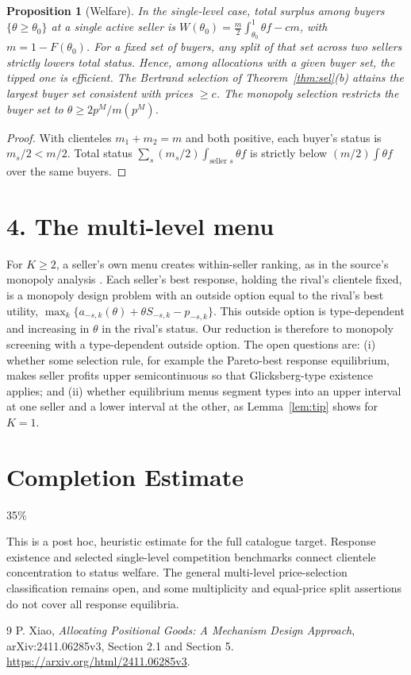 \documentclass[11pt]{article}
\newtheorem{proposition}[theorem]{Proposition}
\theoremstyle{definition}
\begin{document}
\begin{proposition}[Welfare]\label{prop:welfare}
In the single-level case, total surplus among buyers $\{\theta\ge\theta_0\}$ at a single active seller is
$W(\theta_0)=\tfrac{m}{2}\int_{\theta_0}^1\theta f-cm$, with $m=1-F(\theta_0)$. For a fixed set of buyers, any split of that
set across two sellers strictly lowers total status. Hence, among allocations with a given buyer set, the tipped one is
efficient. The Bertrand selection of Theorem~\ref{thm:sel}(b) attains the largest buyer set consistent with prices
$\ge c$. The monopoly selection restricts the buyer set to $\theta\ge2p^M/m(p^M)$.
\end{proposition}
\begin{proof}
With clienteles $m_1+m_2=m$ and both positive, each buyer's status is $m_s/2<m/2$. Total status
$\sum_s(m_s/2)\int_{\text{seller }s}\theta f$ is strictly below $(m/2)\int\theta f$ over the same buyers.
\end{proof}

\section*{4. The multi-level menu}
For $K\ge2$, a seller's own menu creates within-seller ranking, as in the source's monopoly analysis \cite{xiao}. Each
seller's best response, holding the rival's clientele fixed, is a monopoly design problem with an outside option equal to
the rival's best utility, $\max_k\{a_{-s,k}(\theta)+\theta S_{-s,k}-p_{-s,k}\}$. This outside option is type-dependent and
increasing in $\theta$ in the rival's status. Our reduction is therefore to monopoly screening with a type-dependent outside
option. The open questions are: (i) whether some selection rule, for example the Pareto-best response equilibrium, makes
seller profits upper semicontinuous so that Glicksberg-type existence applies; and (ii) whether equilibrium menus segment
types into an upper interval at one seller and a lower interval at the other, as Lemma~\ref{lem:tip} shows for $K=1$.

\section{Completion Estimate}
35\%

This is a post hoc, heuristic estimate for the full catalogue target.
Response existence and selected single-level competition benchmarks connect clientele concentration to status welfare. The general multi-level price-selection classification remains open, and some multiplicity and equal-price split assertions do not cover all response equilibria.

\begin{thebibliography}{9}
 P. Xiao, \emph{Allocating Positional Goods: A Mechanism Design Approach}, arXiv:2411.06285v3, Section 2.1 and Section 5. \url{https://arxiv.org/html/2411.06285v3}.
\end{thebibliography}
\end{document}
